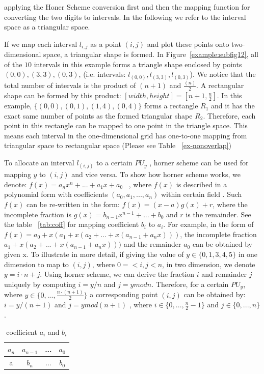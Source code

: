 \documentclass[AMA,LATO1COL]{WileyNJD-v2}
\begin{document}
applying the Honer Scheme conversion first and then the mapping function for converting the two digits to intervals. In the following we refer to the interval space as a triangular space.

If we map each interval $l_{i,j}$ as a point $(i,j)$ and plot these points onto two-dimensional space, a triangular shape is formed. In Figure~\ref{example:subfig12}, all of the $10$ intervals in this example forms a triangle shape enclosed by points ${(0,0),(3,3),(0,3)}$, (i.e. intervals: ${l_{(0,0)},l_{(3,3)},l_{(0,3)}}$). We notice that the total number of intervals is the product of $(n+1)$ and ${\frac{(n)}{2}}$. A rectangular shape can be formed by this product: $[width,height]=[n+1,{\frac{n}{2}}]$. In this example, $\{{(0,0)},{(0,1)},{(1,4)},{(0,4)}\}$ forms a rectangle $R_1$ and it has the exact same number of points as the formed triangular shape $R_2$. Therefore, each point in this rectangle can be mapped to one point in the triangle space. This means each interval in the one-dimensional grid has one-to-one mapping from triangular space to rectangular space (Please see Table ~\ref{ex-nonoverlap})

To allocate an interval $l_{(i,j)}$ to a certain $PU_y$ , horner scheme can be used for mapping $y$ to $(i,j)$ and vice versa. To show how horner scheme works, we denote:
$f(x)= a_nx^n+ ...+ a_1x+ a_0$ ~\cite{horner}, where $f(x)$ is described in a polynomial form with coefficients $(a_0,a_1,...,a_n)$ within certain field . Such $f(x)$ can be re-written in the form: $f(x)= (x-a)g(x)+r$, where the incomplete fraction is $g(x)=b_{n-1}x^{n-1}+...+b_0$ and $r$ is the remainder. See the table ~\ref{tab:coff} for mapping coefficient $b_i$ to $a_i$. For example, in the form of $f(x)=a_0+x(a_1+x(a_2+...+x(a_{n-1}+a_nx)))$, the incomplete fraction $a_1+x(a_2+...+x(a_{n-1}+a_nx)))$ and the remainder $a_0$ can be obtained by given x. To illustrate in more detail, if giving the value of $y\in \{0,1,3,4,5\}$ in one dimension  to map to $(i,j)$, where $0=<i,j<n$, in two dimension, we denote $y=i\cdot n+j$. Using horner scheme, we can derive the fraction $i$ and remainder $j$ uniquely by computing $i=y/n$ and $j=y mod n$. Therefore, for a certain $PU_y$, where $y\in \{0,...,\frac{n \cdot (n+1)}{2}\}$  a corresponding point $(i,j)$ can be obtained by: $i= y /(n+1)$ and $j=y mod (n+1)$ , where $i\in \{0,...,\frac{n}{2}-1\}$ and $j\in\{0,...,n\} $. %

 \begin{table}[t]
\centering \caption{ coefficient $a_i$ and $b_i$ \label{tab:coff}}
     \begin{tabular}{|c|c|c|c|}
	\hline
    $a_n$  &  $a_{n-1}$ &...& $a_0$ \\
	\hline
    a  &  $b_n$ &...&$b_0$  \\
    \hline
\end{tabular}
\label{lrt-compute}
\end{table}
\end{document}
